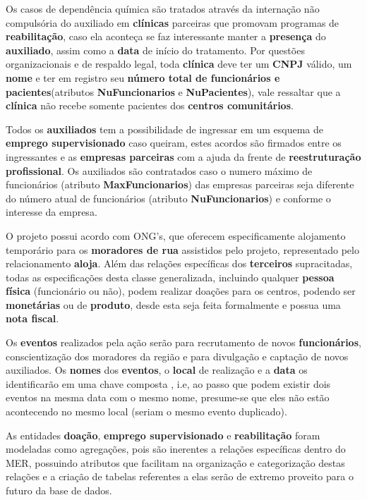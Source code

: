 Os casos de dependência química são tratados através da internação não compulsória do auxiliado em \textbf{clínicas} parceiras que promovam programas de \textbf{reabilitação}, caso ela aconteça se faz interessante manter a \textbf{presença} do \textbf{auxiliado}, assim como a \textbf{data} de início do tratamento. Por questões organizacionais e de respaldo legal, toda \textbf{clínica} deve ter um \textbf{CNPJ} válido, um \textbf{nome} e ter em registro seu \textbf{número total de funcionários e pacientes}(atributos \textbf{NuFuncionarios} e \textbf{NuPacientes}), vale ressaltar que a \textbf{clínica} não recebe somente pacientes dos \textbf{centros comunitários}.

Todos os \textbf{auxiliados} tem a possibilidade de ingressar em um esquema de \textbf{emprego supervisionado} caso queiram, estes acordos são firmados entre os ingressantes e as \textbf{empresas parceiras} com a ajuda da frente de \textbf{reestruturação profissional}. Os auxiliados são contratados caso o numero máximo de funcionários (atributo \textbf{MaxFuncionarios}) das empresas parceiras seja diferente do número atual de funcionários (atributo \textbf{NuFuncionarios}) e conforme o interesse da empresa.

O projeto possui acordo com ONG's, que oferecem especificamente alojamento temporário para os \textbf{moradores de rua} assistidos pelo projeto, representado pelo relacionamento \textbf{aloja}. Além das relações específicas dos \textbf{terceiros} supracitadas, todas as especificações desta classe generalizada, incluindo qualquer \textbf{pessoa física} (funcionário ou não), podem realizar doações para os centros, podendo ser \textbf{monetárias} ou de \textbf{produto}, desde esta seja feita formalmente e possua uma \textbf{nota fiscal}.

Os \textbf{eventos} realizados pela ação serão para recrutamento de novos \textbf{funcionários}, conscientização dos moradores da região e para divulgação e captação de novos auxiliados. Os \textbf{nomes} dos \textbf{eventos}, o \textbf{local} de realização e a \textbf{data} os identificarão em uma chave composta , i.e, ao passo que podem existir dois eventos na mesma data com o mesmo nome, presume-se que eles não estão acontecendo no mesmo local (seriam o mesmo evento duplicado).

As entidades \textbf{doação}, \textbf{emprego supervisionado} e \textbf{reabilitação} foram modeladas como agregações, pois são inerentes a relações específicas dentro do MER, possuindo atributos que facilitam na organização e categorização destas relações e a criação de tabelas referentes a elas serão de extremo proveito para o futuro da base de dados.

